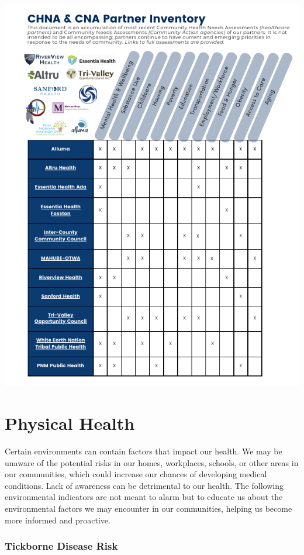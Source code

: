 \documentclass[
  a4paper,
  landscape]{scrreprt}
\begin{document}
\includegraphics{pages/Attachments/localInput/cHNACNAPartnerInventory.png}


\chapter{Physical Health}\label{physical-health}

Certain environments can contain factors that impact our health. We may
be unaware of the potential risks in our homes, workplaces, schools, or
other areas in our communities, which could increase our chances of
developing medical conditions. Lack of awareness can be detrimental to
our health. The following environmental indicators are not meant to
alarm but to educate us about the environmental factors we may encounter
in our communities, helping us become more informed and proactive.

\subsection{Tickborne Disease Risk}\label{tickborne-disease-risk}
\end{document}
